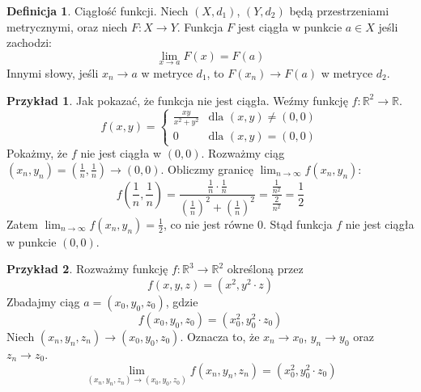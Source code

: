 \documentclass{article}
\theoremstyle{definition}
\newtheorem{de}{Definicja}[subsection]
\theoremstyle{definition}
\theoremstyle{definition}
\newtheorem{pk}{Przykład}[subsection]
\theoremstyle{definition}
\theoremstyle{definition}
\theoremstyle{definition}
\theoremstyle{definition}
\begin{document}
\begin{de}
    Ciągłość funkcji. Niech $(X,d_1)$, $(Y, d_2)$ będą przestrzeniami metrycznymi, oraz niech $F: X \rightarrow Y$.
    Funkcja $F$ jest ciągła w punkcie $a \in X$ jeśli zachodzi:
    \[
    \lim_{x \to a} F(x) = F(a)
    \]
    Innymi słowy, jeśli $x_n \to a$ w metryce $d_1$, to $F(x_n) \to F(a)$ w metryce $d_2$.
\end{de}

\begin{pk}
    Jak pokazać, że funkcja nie jest ciągła. Weźmy funkcję $f: \mathbb{R}^2 \rightarrow \mathbb{R}$.
    \[
    f(x,y)=\begin{cases}
        \frac{xy}{x^2+y^2} & \text{dla } (x,y) \neq (0,0) \\
        0 & \text{dla } (x,y) = (0,0)
    \end{cases}
    \]
    Pokażmy, że $f$ nie jest ciągła w $(0,0)$.
    Rozważmy ciąg $(x_n, y_n) = \left( \frac{1}{n}, \frac{1}{n} \right) \rightarrow (0,0)$.
    Obliczmy granicę $\lim_{n\rightarrow \infty} f(x_n, y_n)$:
    \[
    f\left( \frac{1}{n}, \frac{1}{n} \right) = \frac{\frac{1}{n} \cdot \frac{1}{n}}{\left( \frac{1}{n} \right)^2 + \left( \frac{1}{n} \right)^2} = \frac{\frac{1}{n^2}}{\frac{2}{n^2}} = \frac{1}{2}
    \]
    Zatem $\lim_{n\rightarrow \infty} f(x_n, y_n) = \frac{1}{2}$, co nie jest równe $0$.
    Stąd funkcja $f$ nie jest ciągła w punkcie $(0,0)$.
\end{pk}

\begin{pk}
    Rozważmy funkcję $f: \mathbb{R}^3 \rightarrow \mathbb{R}^2$ określoną przez
    \[
    f(x,y,z) = (x^2, y^2 \cdot z)
    \]
    Zbadajmy ciąg $a=(x_0, y_0, z_0)$, gdzie
    \[
    f(x_0, y_0, z_0) = (x_0^2, y_0^2 \cdot z_0)
    \]
    Niech $(x_n, y_n, z_n) \rightarrow (x_0, y_0, z_0)$. Oznacza to, że $x_n \rightarrow x_0$, $y_n \rightarrow y_0$ oraz $z_n \rightarrow z_0$.
    \[
    \lim_{(x_n, y_n, z_n) \rightarrow (x_0, y_0, z_0)} f(x_n,y_n,z_n) = (x_0^2, y_0^2 \cdot z_0)
    \]
\end{pk}
\end{document}
